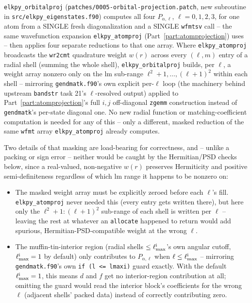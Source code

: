\documentclass[11pt]{article}
\begin{document}
\texttt{elkpy\_orbitalproj} (\texttt{patches/0005-orbital-projection.patch}, new
subroutine in \texttt{src/elkpy\_eigenstates.f90}) computes all four $P_{\alpha,\ell}$,
$\ell=0,1,2,3$, for one atom from a SINGLE fresh diagonalization and a SINGLE
\texttt{wfmtsv} call -- the same wavefunction expansion
\texttt{elkpy\_atomproj} (Part~\ref{part:atomprojection}) uses -- then applies four
separate reductions to that one array. Where \texttt{elkpy\_atomproj} broadcasts the
\texttt{wr2cmt} quadrature weight $w(r)$ across every $(\ell,m)$ entry of a radial shell
(summing the whole shell), \texttt{elkpy\_orbitalproj} builds, per $\ell$, a weight array
nonzero only on the lm sub-range $\ell^2{+}1,\dots,(\ell{+}1)^2$ within each shell --
mirroring \texttt{gendmatk.f90}'s own explicit per-$\ell$ loop (the machinery behind
upstream \texttt{bandstr} task 21's $\ell$-resolved output) applied to
Part~\ref{part:atomprojection}'s full $i,j$ off-diagonal \texttt{zgemm} construction
instead of \texttt{gendmatk}'s per-state diagonal one. No new radial function or
matching-coefficient computation is needed for any of this -- only a different, masked
reduction of the same \texttt{wfmt} array \texttt{elkpy\_atomproj} already computes.

Two details of that masking are load-bearing for correctness, and -- unlike a packing or
sign error -- neither would be caught by the Hermitian/PSD checks below, since a
real-valued, non-negative $w(r)$ preserves Hermiticity and positive semi-definiteness
regardless of which lm range it happens to be nonzero on:
\begin{itemize}
\item The masked weight array must be explicitly zeroed before each $\ell$'s fill.
  \texttt{elkpy\_atomproj} never needed this (every entry gets written there), but here
  only the $\ell^2{+}1{:}(\ell{+}1)^2$ sub-range of each shell is written per $\ell$ --
  leaving the rest at whatever an \texttt{allocate} happened to return would add
  spurious, Hermitian-PSD-compatible weight at the wrong $\ell$.
\item The muffin-tin-interior region (radial shells $\le\ell_{\rm max}^{\rm i}$'s own
  angular cutoff, $\ell_{\rm max}^{\rm i}=1$ by default) only contributes to
  $P_{\alpha,\ell}$ when $\ell\le\ell_{\rm max}^{\rm i}$ -- mirroring
  \texttt{gendmatk.f90}'s own \texttt{if (l <= lmaxi)} guard exactly. With the default
  $\ell_{\rm max}^{\rm i}=1$, this means $d$ and $f$ get no interior-region contribution
  at all; omitting the guard would read the interior block's coefficients for the wrong
  $\ell$ (adjacent shells' packed data) instead of correctly contributing zero.
\end{itemize}
\end{document}
